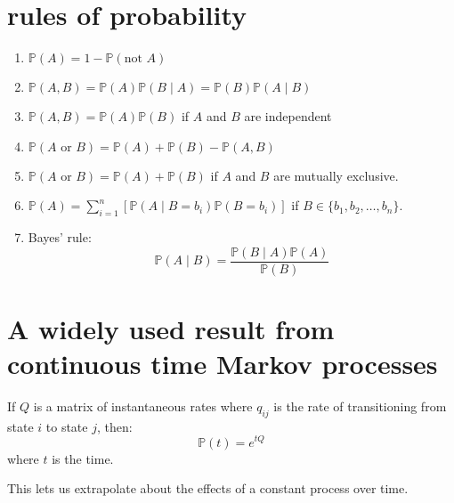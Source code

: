\documentclass[landscape]{foils}
\renewcommand{\Pr}{\mathbb{P}}
\begin{document}
\section*{rules of probability}
\begin{enumerate}
  \item $\Pr(A) = 1 - \Pr(\mbox{not } A)$
  \item $\Pr(A,B) = \Pr(A)\Pr(B\mid A) = \Pr(B)\Pr(A\mid B)$
  \item $\Pr(A,B) = \Pr(A)\Pr(B)$ if $A$ and $B$ are independent
  \item $\Pr(A\mbox{ or } B) = \Pr(A) + \Pr(B) - \Pr(A,B)$
  \item $\Pr(A\mbox{ or } B) = \Pr(A) + \Pr(B)$ if $A$ and $B$ are mutually exclusive.
  \item $\Pr(A) = \sum_{i=1}^n\left[\Pr(A\mid B=b_i)\Pr(B=b_i)\right]$ if $B \in \{b_1, b_2,\ldots, b_n\}$.
  \item Bayes' rule:$$\Pr(A\mid B) = \frac{\Pr(B\mid A)\Pr(A)}{\Pr(B)}$$
\end{enumerate}

\myNewSlide
\section*{A widely used result from continuous time Markov processes}

If $Q$ is a matrix of instantaneous rates where $q_{ij}$ is the rate
of transitioning from state $i$ to state $j$, then:
$$\Pr(t) = e^{tQ}$$
where $t$ is the time.

This lets us extrapolate about the effects of a constant process over time.
\end{document}

